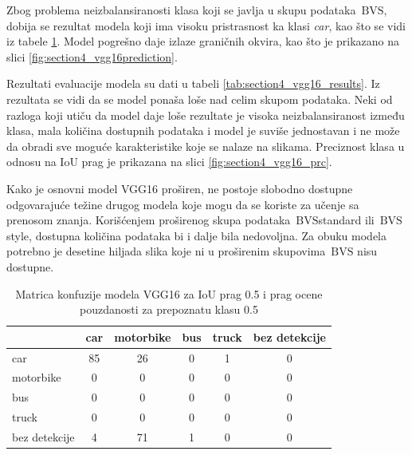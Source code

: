 \documentclass[12pt,oneside]{memoir}
\newcommand{\bvs}{\ensuremath{\,\textrm{BVS}}}
\begin{document}
Zbog problema neizbalansiranosti klasa koji se javlja u skupu podataka \bvs, dobija se rezultat modela koji ima visoku pristrasnost ka klasi \textit{car}, kao što se vidi iz tabele \ref{tab:section4_vgg16_confusionmatrix}. Model pogrešno daje izlaze graničnih okvira, kao što je prikazano na slici \ref{fig:section4_vgg16prediction}.

Rezultati evaluacije modela su dati u tabeli \ref{tab:section4_vgg16_results}. Iz rezultata se vidi da se model ponaša loše nad celim skupom podataka. Neki od razloga koji utiču da model daje loše rezultate je visoka neizbalansiranost između klasa, mala količina dostupnih podataka i model je suviše jednostavan i ne može da obradi sve moguće karakteristike koje se nalaze na slikama. Preciznost klasa u odnosu na IoU prag je prikazana na slici \ref{fig:section4_vgg16_prc}.

Kako je osnovni model VGG16 proširen, ne postoje slobodno dostupne odgovarajuće težine drugog modela koje mogu da se koriste za učenje sa prenosom znanja.
Korišćenjem proširenog skupa podataka \bvs{standard} ili \bvs{style}, dostupna količina podataka bi i dalje bila nedovoljna. Za obuku modela potrebno je desetine hiljada slika koje ni u proširenim skupovima \bvs{} nisu dostupne.


\begin{table}[h!]
    \begin{center}
    \caption{Matrica konfuzije modela VGG16 za IoU prag 0.5 i prag ocene pouzdanosti za prepoznatu klasu 0.5}
    \begin{tabular}{ l|c|c|c|c|c|}
                  & car  & motorbike & bus & truck & bez detekcije \\ \hline
    car           & 85   & 26        & 0   & 1     & 0             \\ 
    motorbike     & 0    & 0         & 0   & 0     & 0             \\ 
    bus           & 0    & 0         & 0   & 0     & 0             \\ 
    truck         & 0    & 0         & 0   & 0     & 0             \\ 
    bez detekcije & 4    & 71        & 1   & 0     & 0             \\ \hline
    \hline
    \end{tabular}
    \label{tab:section4_vgg16_confusionmatrix}
    \end{center}
\end{table}
\end{document}
